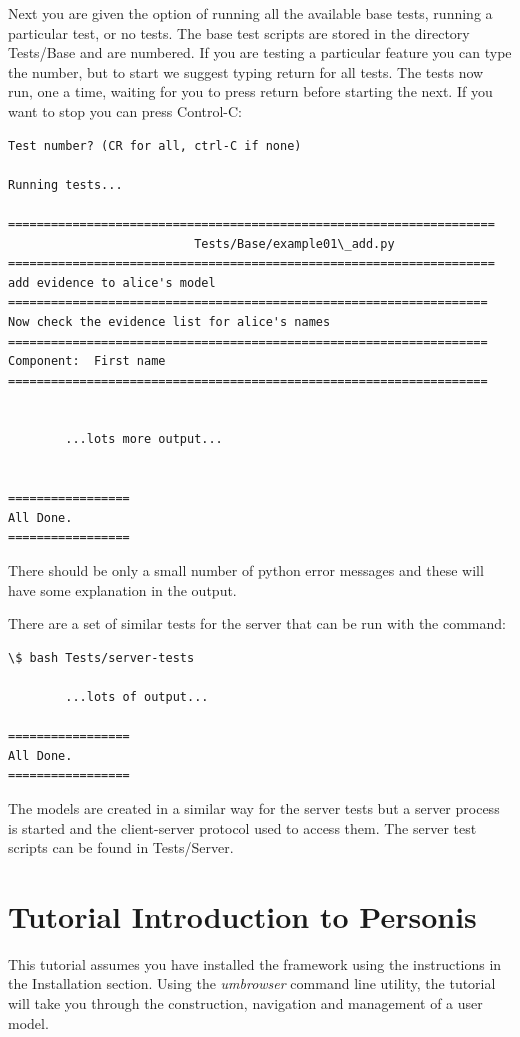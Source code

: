 \documentclass[letterpaper,10pt,english]{sphinxmanual}
\begin{document}
Next you are given the option of running all the available base tests, running a particular test, or no tests.
The base test scripts are stored in the directory Tests/Base and are numbered. If you are testing a particular
feature you can type the number, but to start we suggest typing return for all tests.
The tests now run, one a time, waiting for you to press return before starting the next. If you want to stop
you can press Control-C:

\begin{Verbatim}[commandchars=\\\{\}]
Test number? (CR for all, ctrl-C if none)

Running tests...

====================================================================
                          Tests/Base/example01\_add.py
====================================================================
add evidence to alice's model
===================================================================
Now check the evidence list for alice's names
===================================================================
Component:  First name
===================================================================


        ...lots more output...


=================
All Done.
=================
\end{Verbatim}

There should be only a small number of python error messages and these will have some explanation in the output.

There are a set of similar tests for the server that can be run with the command:

\begin{Verbatim}[commandchars=\\\{\}]
\$ bash Tests/server-tests

        ...lots of output...

=================
All Done.
=================
\end{Verbatim}

The models are created in a similar way for the server tests but a server process is started and the
client-server protocol used to access them. The server test scripts can be found in Tests/Server.


\chapter{Tutorial Introduction to Personis}
\label{Tutorial::doc}\label{Tutorial:tutorial-introduction-to-personis}
This tutorial assumes you have installed the framework using the instructions in the Installation section.
Using the \emph{umbrowser} command line utility, the tutorial will take you through the construction, navigation and
management of a user model.
\end{document}
